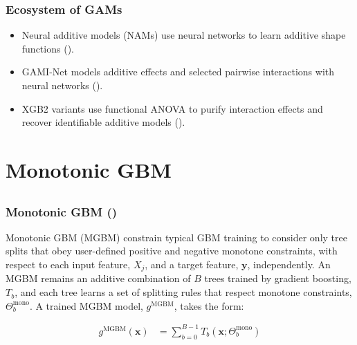 \documentclass[11pt,aspectratio=169,hyperref={colorlinks}]{beamer}
\begin{document}
	\begin{frame}
	
		\frametitle{Ecosystem of GAMs}
		
		\small
		\begin{itemize}
			\item Neural additive models (NAMs) use neural networks to learn additive shape functions (\cite{agarwal2021neural}).
			\item GAMI-Net models additive effects and selected pairwise interactions with neural networks (\cite{yang2021gami}).
			\item XGB2 variants use functional ANOVA to purify interaction effects and recover identifiable additive models (\cite{lengerich2020purifying}).
		\end{itemize}
		\normalsize
		 
	\end{frame}


	\section{Monotonic GBM}

	\subsection*{}
	
	\begin{frame}
	
		\frametitle{Monotonic GBM (\cite{rml_workflow})}

			Monotonic GBM (MGBM) constrain typical GBM training to consider only tree splits that obey user-defined positive and negative monotone constraints, with respect to each input feature, $X_j$, and a target feature, $\mathbf{y}$, independently. An MGBM remains an additive combination of $B$ trees trained by gradient boosting, $T_b$, and each tree learns a set of splitting rules that respect monotone constraints,  $\Theta^\text{mono}_b$. A trained MGBM model, $g^{\text{MGBM}}$, takes the form:
			
			\begin{equation}
			\begin{aligned}\label{eq:mgbm}
			g^{\text{MGBM}}(\mathbf{x}) &= \sum_{b=0}^{B-1} T_b\left(\mathbf{x}; \Theta^\text{mono}_b\right)
			\end{aligned}
			\end{equation}
		
	\end{frame}
\end{document}
